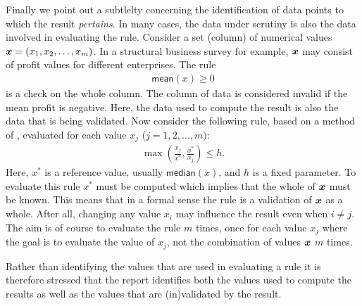 Finally we point out a subtlelty concerning the identification of data points
to which the result \emph{pertains}. In many cases, the data under scrutiny is
also the data involved in evaluating the rule. Consider a set (column) of
numerical values $\boldsymbol{x}=(x_1,x_2,\ldots,x_m)$. In a structural business survey
for example, $\boldsymbol{x}$ may consist of profit values for different enterprises.
The rule 
\begin{align*}
\textsf{mean}(x) \geq 0
\end{align*}
is a check on the whole column. The column of data is considered invalid if the mean
profit is negative. Here, the data used to compute the result is also the data that
is being validated. Now consider the following rule, based on a method of 
\citet{hiridoglou1986statistical}, evaluated for each value $x_j$ ($j=1,2,\ldots, m)$:
\begin{align*}
\max\left(\frac{x_j}{x^*},\frac{x^*}{x_j}\right) \leq h.
\end{align*}
Here, $x^*$ is a reference value, usually $\textsf{median}(x)$, and $h$ is a
fixed parameter. To evaluate this rule $x^*$ must be computed which implies
that the whole of $\boldsymbol{x}$ must be known. This means that in a formal sense the
rule is a validation of $\boldsymbol{x}$ as a whole. After all, changing any value
$x_{i}$ may influence the result even when $i\not=j$. The aim is of course to
evaluate the rule $m$ times, once for each value $x_j$ where the goal is to
evaluate the value of $x_j$, not the combination of values $\boldsymbol{x}$ $m$ times.

Rather than identifying the values that are used in evaluating a rule it is
therefore stressed that the report identifies both the values used to compute
the results as well as the values that are (in)validated by the result.





